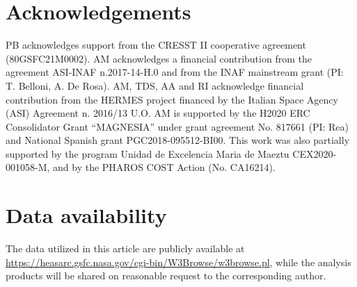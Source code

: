 \documentclass[fleqn,usenatbib]{mnras}
\begin{document}
\section*{Acknowledgements}
PB acknowledges support from the CRESST II cooperative agreement (80GSFC21M0002). AM acknowledges a financial contribution from the agreement ASI-INAF n.2017-14-H.0 and from the INAF mainstream grant (PI: T. Belloni, A. De Rosa). AM, TDS, AA and RI acknowledge financial contribution from the HERMES project financed by the Italian Space Agency (ASI) Agreement n. 2016/13 U.O. AM is supported by the H2020 ERC Consolidator Grant “MAGNESIA” under grant agreement No. 817661 (PI: Rea) and National Spanish grant PGC2018-095512-BI00. This work was also partially supported by the program Unidad de Excelencia Maria de Maeztu CEX2020-001058-M, and by the PHAROS COST Action (No. CA16214).

\section*{Data availability }
The data utilized in this article are publicly available at \href{https://heasarc.gsfc.nasa.gov/cgi-bin/W3Browse/w3browse.pl}{https://heasarc.gsfc.nasa.gov/cgi-bin/W3Browse/w3browse.pl}, while the analysis products will be shared on reasonable request to the corresponding author.













\bsp	%
\label{lastpage}
\end{document}
